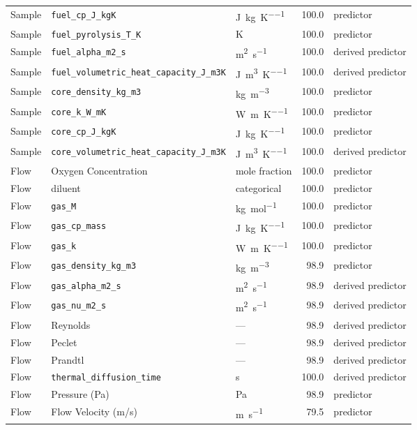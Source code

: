 {\begin{longtable}{@{}p{}p{}p{}r p{}@{}}
Sample & \texttt{fuel\_cp\_J\_kgK} & \si{\joule\per\kilogram\per\kelvin} & 100.0 & predictor \\
Sample & \texttt{fuel\_pyrolysis\_T\_K} & K & 100.0 & predictor \\
Sample & \texttt{fuel\_alpha\_m2\_s} & \si{\metre\squared\per\second} & 100.0 & derived predictor \\
Sample & \texttt{fuel\_volumetric\_heat\_capacity\_J\_m3K} & \si{\joule\per\metre\cubed\per\kelvin} & 100.0 & derived predictor \\
Sample & \texttt{core\_density\_kg\_m3} & \si{\kilogram\per\metre\cubed} & 100.0 & predictor \\
Sample & \texttt{core\_k\_W\_mK} & \si{\watt\per\metre\per\kelvin} & 100.0 & predictor \\
Sample & \texttt{core\_cp\_J\_kgK} & \si{\joule\per\kilogram\per\kelvin} & 100.0 & predictor \\
Sample & \texttt{core\_volumetric\_heat\_capacity\_J\_m3K} & \si{\joule\per\metre\cubed\per\kelvin} & 100.0 & derived predictor \\
Flow & Oxygen Concentration & mole fraction & 100.0 & predictor \\
Flow & diluent & categorical & 100.0 & predictor \\
Flow & \texttt{gas\_M} & \si{\kilogram\per\mole} & 100.0 & predictor \\
Flow & \texttt{gas\_cp\_mass} & \si{\joule\per\kilogram\per\kelvin} & 100.0 & predictor \\
Flow & \texttt{gas\_k} & \si{\watt\per\metre\per\kelvin} & 100.0 & predictor \\
Flow & \texttt{gas\_density\_kg\_m3} & \si{\kilogram\per\metre\cubed} & 98.9 & predictor \\
Flow & \texttt{gas\_alpha\_m2\_s} & \si{\metre\squared\per\second} & 98.9 & derived predictor \\
Flow & \texttt{gas\_nu\_m2\_s} & \si{\metre\squared\per\second} & 98.9 & derived predictor \\
Flow & Reynolds & --- & 98.9 & derived predictor \\
Flow & Peclet & --- & 98.9 & derived predictor \\
Flow & Prandtl & --- & 98.9 & derived predictor \\
Flow & \texttt{thermal\_diffusion\_time} & s & 100.0 & derived predictor \\
Flow & Pressure (Pa) & Pa & 98.9 & predictor \\
Flow & Flow Velocity (m/s) & \si{\metre\per\second} & 79.5 & predictor \\

\end{longtable}}
